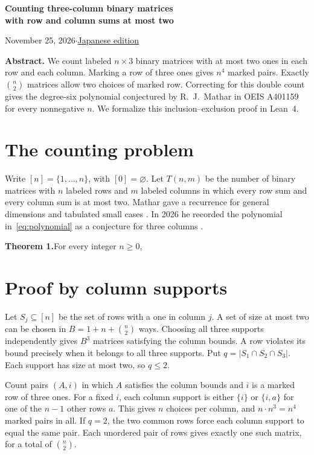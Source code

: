 \documentclass[a4paper,11pt]{article}
\begin{document}
\begin{center}
  {\Large\bfseries Counting three-column binary matrices\\[2pt]
    with row and column sums at most two\par}
  \vspace{4pt}
  {\small November 25, 2026\quad$\cdot$\quad\href{https://github.com/nktkt/math/blob/main/research/mathar_three_columns/output/pdf/three-columns-ja.pdf}{Japanese edition}\par}
\end{center}
\smallskip

\noindent\textbf{Abstract.}\quad
We count labeled $n\times3$ binary matrices with at most two ones in each row and
each column. Marking a row of three ones gives $n^4$ marked pairs. Exactly
$\binom n2$ matrices allow two choices of marked row. Correcting for this double
count gives the degree-six
polynomial conjectured by R.~J.~Mathar in OEIS A401159 for
every nonnegative $n$. We formalize this inclusion--exclusion proof in Lean~4.

\section{The counting problem}
Write $[n]=\{1,\ldots,n\}$, with $[0]=\varnothing$. Let $T(n,m)$ be the number of
binary matrices with $n$ labeled rows and $m$ labeled columns in which every row
sum and every column sum is at most two. Mathar gave a recurrence for general
dimensions and tabulated small cases \cite[Section~2 and Table~2]{mathar2014}.
In 2026 he recorded the polynomial in~\eqref{eq:polynomial} as a conjecture for
three columns \cite{oeis}.

\smallskip
\noindent\textbf{Theorem 1.}\quad For every integer $n\geq 0$,
\threeColumnIdentities

\section{Proof by column supports}
Let $S_j\subseteq[n]$ be the set of rows with a one in column $j$. A set of size
at most two can be chosen in $B=1+n+\binom n2$ ways. Choosing all three supports
independently gives $B^3$ matrices satisfying the column bounds. A row violates
its bound precisely when it belongs to all three supports. Put
$q=|S_1\cap S_2\cap S_3|$. Each support has size at most two, so $q\leq 2$.

Count pairs $(A,i)$ in which $A$ satisfies the column bounds and $i$ is a marked
row of three ones. For a fixed $i$, each column support is either $\{i\}$ or
$\{i,a\}$ for one of the $n-1$ other rows $a$. This gives $n$ choices per column,
and $n\cdot n^3=n^4$ marked pairs in all. If $q=2$, the two common rows force
each column support to equal the same pair. Each unordered pair of rows gives
exactly one such matrix, for a total of $\binom n2$.
\end{document}
